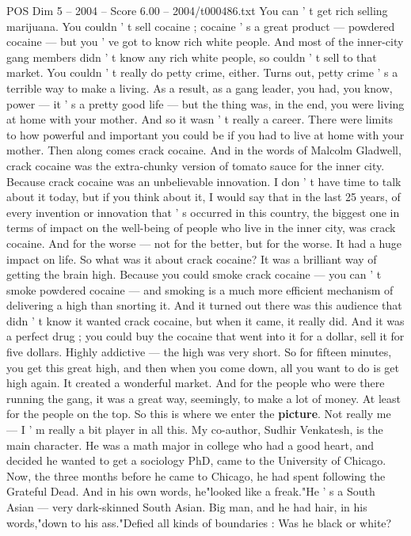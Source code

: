 \begin{textsample}{POS Dim 5 – 2004 – Score 6.00 – 2004/t000486.txt}
You can ' t get rich selling marijuana.
You couldn ' t sell cocaine ; cocaine ' s a great product — powdered cocaine — but you ' ve got to know rich white people.
And most of the inner-city gang members didn ' t know any rich white people, so couldn ' t sell to that market.
You couldn ' t really do petty crime, either.
Turns out, petty crime ' s a terrible way to make a living.
As a result, as a gang leader, you had, you know, power — it ' s a pretty good life — but the thing was, in the end, you were living at home with your mother.
And so it wasn ' t really a career.
There were limits to how powerful and important you could be if you had to live at home with your mother.
Then along comes crack cocaine.
And in the words of Malcolm Gladwell, crack cocaine was the extra-chunky version of tomato sauce for the inner city.
Because crack cocaine was an unbelievable innovation.
I don ' t have time to talk about it today, but if you think about it, I would say that in the last 25 years, of every invention or innovation that ' s occurred in this country, the biggest one in terms of impact on the well-being of people who live in the inner city, was crack cocaine.
And for the worse — not for the better, but for the worse.
It had a huge impact on life.
So what was it about crack cocaine?
It was a brilliant way of getting the brain high.
Because you could smoke crack cocaine — you can ' t smoke powdered cocaine — and smoking is a much more efficient mechanism of delivering a high than snorting it.
And it turned out there was this audience that didn ' t know it wanted crack cocaine, but when it came, it really did.
And it was a perfect drug ; you could buy the cocaine that went into it for a dollar, sell it for five dollars.
Highly addictive — the high was very short.
So for fifteen minutes, you get this great high, and then when you come down, all you want to do is get high again.
It created a wonderful market.
And for the people who were there running the gang, it was a great way, seemingly, to make a lot of money.
At least for the people on the top.
So this is where we enter the \textbf{picture}.
Not really me — I ' m really a bit player in all this.
My co-author, Sudhir Venkatesh, is the main character.
He was a math major in college who had a good heart, and decided he wanted to get a sociology PhD, came to the University of Chicago.
Now, the three months before he came to Chicago, he had spent following the Grateful Dead.
And in his own words, he"looked like a freak."He ' s a South Asian — very dark-skinned South Asian.
Big man, and he had hair, in his words,"down to his ass."Defied all kinds of boundaries : Was he black or white?

\end{textsample}

